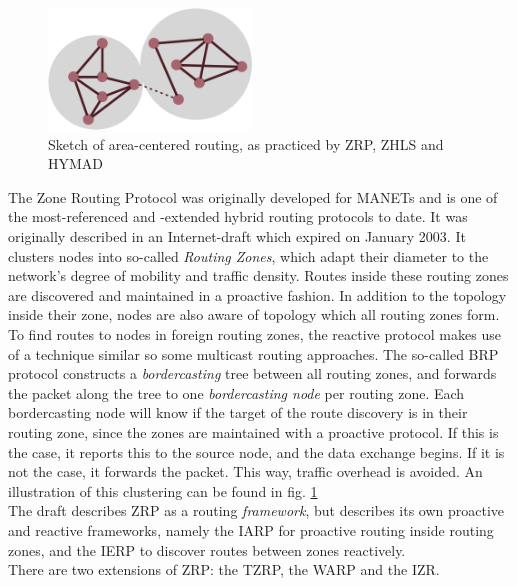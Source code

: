 \documentclass[a4paper,10pt]{scrartcl}
\begin{document}
\begin{figure}
  \begin{center}
    \includegraphics[width=0.48\textwidth]{../images/ZRP}
  \end{center}
  \caption{Sketch of area-centered routing, as practiced by ZRP, ZHLS and HYMAD}
  \label{fig:zrp_area_centered}
\end{figure}

The Zone Routing Protocol was originally developed for \glspl{MANET} and is one of the most-referenced and -extended hybrid routing protocols to date. It was originally described in an Internet-draft which expired on January 2003\cite{ZRP-Draft}.
It clusters nodes into so-called \emph{Routing Zones}, which adapt their diameter to the network's degree of mobility and traffic density. Routes inside these routing zones are discovered and maintained in a proactive fashion. In addition to the topology inside their zone, nodes are also aware of topology which all routing zones form.
To find routes to nodes in foreign routing zones, the reactive protocol makes use of a technique similar so some multicast routing approaches. The so-called \gls{BRP}\cite{draft-ietf-manet-zone-brp} protocol constructs a \emph{bordercasting} tree between all routing zones, and forwards the packet along the tree to one \emph{bordercasting node} per routing zone. Each bordercasting node will know if the target of the route discovery is in their routing zone, since the zones are maintained with a proactive protocol. If this is the case, it reports this to the source node, and the data exchange begins. If it is not the case, it forwards the packet. This way, traffic overhead is avoided. An illustration of this clustering can be found in fig. \ref{fig:zrp_area_centered}\\
The draft describes ZRP as a routing \emph{framework}, but describes its own proactive and reactive frameworks, namely the \gls{IARP}\cite{draft-ietf-manet-zone-iarp} for proactive routing inside routing zones, and the \gls{IERP}\cite{draft-ietf-manet-zone-ierp} to discover routes between zones reactively.\\
There are two extensions of ZRP: the \gls{TZRP}\cite{TZRP}, the \gls{WARP}\cite{WARP}  and the \gls{IZR}\cite{IZR}. 
\end{document}
